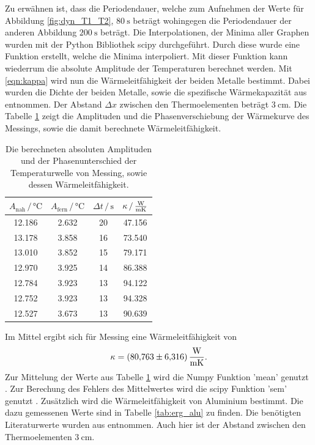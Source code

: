 
Zu erwähnen ist, dass die Periodendauer, welche zum Aufnehmen der Werte für Abbildung \ref{fig:dyn_T1_T2}, $\SI{80}{\second}$ beträgt wohingegen die Periodendauer der anderen Abbildung $\SI{200}{\second}$ beträgt.
Die Interpolationen, der Minima aller Graphen wurden mit der Python Bibliothek scipy \cite{scipy} durchgeführt.
Durch diese wurde eine Funktion erstellt, welche die Minima interpoliert.
Mit dieser Funktion kann wiederrum die absolute Amplitude der Temperaturen berechnet werden.
Mit \eqref{eqn:kappa} wird nun die Wärmeleitfähigkeit der beiden Metalle bestimmt.
Dabei wurden die Dichte der beiden Metalle, sowie die spezifische Wärmekapazität aus \cite{anleitung} entnommen.
Der Abstand $\Delta x$ zwischen den Thermoelementen beträgt $\SI{3}{\centi\meter}$.
Die Tabelle \ref{tab:erg_mess} zeigt die Amplituden und die Phasenverschiebung der Wärmekurve des Messings, sowie die damit berechnete Wärmeleitfähigkeit.
\begin{table}
\centering
\caption{Die berechneten absoluten Amplituden und der Phasenunterschied der Temperaturwelle von Messing, sowie dessen Wärmeleitfähigkeit.}
\begin{tabular}{cccc}    
    \toprule
    $A_\text{nah} \,/\, \si{\celsius}$ & $A_\text{fern} \,/\, \si{\celsius}$ & $\Delta t \,/\, \si{\second}$ & $\kappa \, / \, \si{\frac{\watt}{\meter\kelvin}}$ \\
    \midrule
    12.186 & 2.632 & 20 & 47.156 \\
    13.178 & 3.858 & 16 & 73.540 \\
    13.010 & 3.852 & 15 & 79.171 \\
    12.970 & 3.925 & 14 & 86.388 \\
    12.784 & 3.923 & 13 & 94.122 \\
    12.752 & 3.923 & 13 & 94.328 \\
    12.527 & 3.673 & 13 & 90.639 \\
    \bottomrule
\end{tabular}
\label{tab:erg_mess}
\end{table}
\FloatBarrier
Im Mittel ergibt sich für Messing eine Wärmeleitfähigkeit von 
\begin{equation*}
    \kappa = \SI{80.763(6316)}{\frac{\watt}{\meter\kelvin}} .
\end{equation*}
Zur Mittelung der Werte aus Tabelle \ref{tab:erg_mess} wird die Numpy Funktion 'mean' genutzt \cite{numpy}.
Zur Berechung des Fehlers des Mittelwertes wird die scipy Funktion 'sem' genutzt \cite{scipy}.
Zusätzlich wird die Wärmeleitfähigkeit von Aluminium bestimmt. Die dazu gemessenen Werte sind in Tabelle \ref{tab:erg_alu} zu finden.
Die benötigten Literaturwerte wurden aus \cite{anleitung} entnommen. Auch hier ist der Abstand zwischen den Thermoelementen $\SI{3}{\centi\meter}$.

